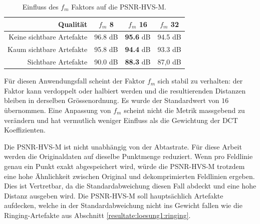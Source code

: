\begin{table}[!htbp]
\center
\begin{tabular}{r|c|c|c}
	Qualität &$f_m$ 8 &$f_m$ 16 &$f_m$ 32 \\\hline
	Keine sichtbare Artefakte & 96.8 dB & \textbf{95.6} dB& 94.5 dB \\
	Kaum sichtbare Artefakte & 95.8 dB & \textbf{94.4} dB& 93.3 dB\\
  Sichtbare Artefakte & 90.0 dB & \textbf{88.3} dB & 87,0 dB
\end{tabular}
\caption{Einfluss des $f_m$ Faktors auf die PSNR-HVS-M.}
\label{testsetup:psnr:umsetzung:tabelle:f_m}
\end{table}
Für diesen Anwendungsfall scheint der Faktor $f_m$ sich stabil zu verhalten: der Faktor kann verdoppelt oder halbiert werden und die resultierenden Distanzen bleiben in derselben Grössenordnung. Es wurde der Standardwert von $16$ übernommen. Eine Anpassung von $f_m$ scheint nicht die Metrik massgebend zu verändern und hat vermutlich weniger Einfluss als die Gewichtung der DCT Koeffizienten.

Die PSNR-HVS-M ist nicht unabhängig von der Abtastrate. Für diese Arbeit werden die Originaldaten auf dieselbe Punktmenge reduziert. Wenn pro Feldlinie genau ein Punkt exakt abgespeichert wird, würde die PSNR-HVS-M trotzdem eine hohe Ähnlichkeit zwischen Original und dekomprimierten Feldlinien ergeben. Dies ist Vertretbar, da die Standardabweichung diesen Fall abdeckt und eine hohe Distanz ausgeben wird. Die PSNR-HVS-M soll hauptsächlich Artefakte aufdecken, welche in der Standardabweichung nicht ins Gewicht fallen wie die Ringing-Artefakte aus Abschnitt \ref{resultate:loesung1:ringing}.
